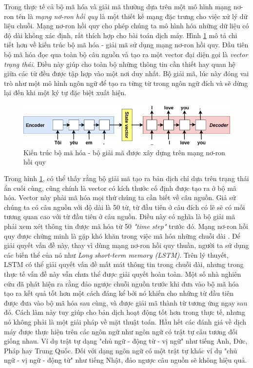 Trong thực tế cả bộ mã hóa và giải mã thường dựa trên một mô hình mạng nơ-ron tên là \textit{mạng nơ-ron hồi quy} là một thiết kế mạng đặc trưng cho việc xử lý dữ liệu chuỗi. Mạng nơ-ron hồi quy cho phép chúng ta mô hình hóa những dữ liệu có độ dài không xác định, rất thích hợp cho bài toán dịch máy. Hình \ref{fig_encoder_decoder_details} mô tả chi tiết hơn về kiến trúc bộ mã hóa - giải mã sử dụng mạng nơ-ron hồi quy. Đầu tiên bộ mã hóa đọc qua toàn bộ câu nguồn và tạo ra một vector đại diện gọi là \textit{vector trạng thái}. Điều này giúp cho toàn bộ những thông tin cần thiết hay quan hệ giữa các từ đều được tập hợp vào một nơi duy nhất. Bộ giải mã, lúc này đóng vai trò như một mô hình ngôn ngữ để tạo ra từng từ trong ngôn ngữ đích và sẽ dừng lại đến khi một ký tự đặc biệt xuất hiện.

\begin{figure}
	\centering
	\includegraphics[width=\textwidth]{encoder-decoder}
	\caption[Kiến trúc bộ mã hóa - bộ giải mã được xây dựng trên mạng nơ-ron hồi quy]{Kiến trúc bộ mã hóa - bộ giải mã được xây dựng trên mạng nơ-ron hồi quy}
	\label{fig_encoder_decoder_details}
\end{figure}

Trong hình \ref{fig_encoder_decoder_details}, có thể thấy rằng bộ giải mã tạo ra bản dịch chỉ dựa trên trạng thái ẩn cuối cùng, cũng chính là vector có kích thước cố định được tạo ra ở bộ mã hóa. Vector này phải mã hóa mọi thứ chúng ta cần biết về câu nguồn. Giả sử chúng ta có câu nguồn với độ dài là 50 từ, từ đầu tiên ở câu đích có lẽ sẽ có mối tương quan cao với từ đầu tiên ở câu nguồn. Điều này có nghĩa là bộ giải mã phải xem xét thông tin được mã hóa từ 50 \textit{"time step"} trước đó. Mạng nơ-ron hồi quy được chứng minh là gặp khó khăn trong việc mã hóa những chuỗi dài \cite{difficultyRNN}. Để giải quyết vấn đề này, thay vì dùng mạng nơ-ron hồi quy thuần, người ta sử dụng các biến thể của nó như \textit{Long short-term memory (LSTM)}. Trên lý thuyết, LSTM có thể giải quyết vấn đề mất mát thông tin trong chuỗi dài, nhưng trong thực tế vấn đề này vẫn chưa thể được giải quyết hoàn toàn. Một số nhà nghiên cứu đã phát hiện ra rằng đảo ngược chuỗi nguồn trước khi đưa vào bộ mã hóa tạo ra kết quả tốt hơn một cách đáng kể \cite{Seq2Seq2014} bởi nó khiến cho những từ đầu tiên được đưa vào bộ mã hóa sau cùng, và được giải mã thành từ tương ứng ngay sau đó. Cách làm này tuy giúp cho bản dịch hoạt động tốt hơn trong thực tế, nhưng nó không phải là một giải pháp về mặt thuật toán. Hầu hết các đánh giá về dịch máy được thực hiện trên các ngôn ngữ như ngôn ngữ có trật tự câu tương đối giống nhau. Ví dụ trật tự dạng "chủ ngữ - động từ - vị ngữ" như tiếng Anh, Đức, Pháp hay Trung Quốc. Đối với dạng ngôn ngữ có một trật tự khác ví dụ "chủ ngữ - vị ngữ - động từ" như tiếng Nhật, đảo ngược câu nguồn sẽ không hiệu quả.

